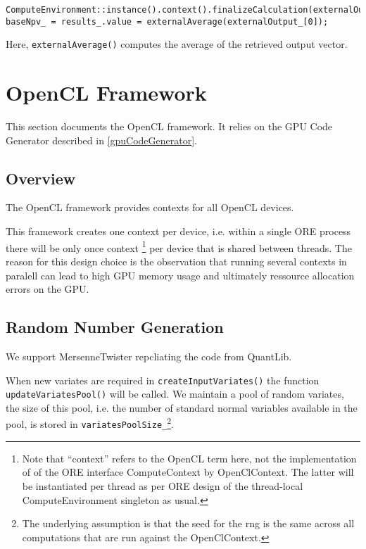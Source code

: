 \documentclass[12pt, a4paper]{article}
\begin{document}
\begin{verbatim}
ComputeEnvironment::instance().context().finalizeCalculation(externalOutputPtr_);
baseNpv_ = results_.value = externalAverage(externalOutput_[0]);
\end{verbatim}

Here, \verb+externalAverage()+ computes the average of the retrieved output vector.


\section{OpenCL Framework}

This section documents the OpenCL framework. It relies on the GPU Code Generator described in \ref{gpuCodeGenerator}.

\subsection{Overview}

The OpenCL framework provides contexts for all OpenCL devices.

This framework creates one context per device, i.e. within a single ORE process there will be only once
context \footnote{Note that ``context'' refers to the OpenCL term here, not the implementation of of the ORE interface
ComputeContext by OpenClContext. The latter will be instantiated per thread as per ORE design of the thread-local
ComputeEnvironment singleton as usual.} per device that is shared between threads. The reason for this design choice is
the observation that running several contexts in paralell can lead to high GPU memory usage and ultimately ressource
allocation errors on the GPU.

\subsection{Random Number Generation}

We support MersenneTwister repcliating the code from QuantLib. 

When new variates are required in \verb+createInputVariates()+ the function \verb+updateVariatesPool()+ will be
called. We maintain a pool of random variates, the size of this pool, i.e. the number of standard normal variables
available in the pool, is stored in \verb+variatesPoolSize_+\footnote{The underlying assumption is that the seed for the
rng is the same across all computations that are run against the OpenClContext.}.
\end{document}
